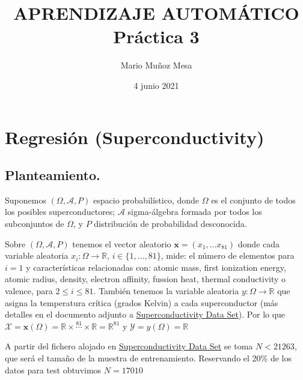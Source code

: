 \documentclass[11pt,a4paper]{article}
\title{
\normalfont \normalsize 
\textsc{\small APRENDIZAJE AUTOMÁTICO} \\ [10pt]
	
	
\huge \bf Práctica 3\\


	}
\author{Mario Muñoz Mesa}
\date{4 junio 2021}
\theoremstyle{definition}
\newcommand{\R}{\mathbb{R}}
\begin{document}
	\maketitle
	\renewcommand*\contentsname{Índice}	
	\tableofcontents
	
	\newpage
	
	\section{Regresión (Superconductivity)}
	\subsection{Planteamiento.}
	Suponemos $(\Omega, \mathcal{A}, P)$ espacio probabilístico, donde $\Omega$ es el conjunto de todos los posibles superconductores; $\mathcal{A}$ sigma-álgebra formada por todos los subconjuntos de $\Omega$, y $P$ distribución de probabilidad desconocida.
	
	Sobre $(\Omega, \mathcal{A}, P)$ tenemos el vector aleatorio $\mathbf{x}=(x_1,\ldots x_{81})$ donde cada variable aleatoria $x_i\colon \Omega \to \R$, $i\in \{1,\ldots,81\}$, mide: el número de elementos para $i=1$ y características relacionadas con: atomic mass, first ionization energy, atomic radius, density, electron affinity, fussion heat, thermal conductivity o valence, para $2\leq i \leq 81$. También tenemos la variable aleatoria $y\colon \Omega \to \R$ que asigna la temperatura crítica (grados Kelvin) a cada superconductor (más detalles en el documento adjunto a \href{https://archive.ics.uci.edu/ml/datasets/Superconductivty+Data}{
Superconductivity Data Set}). Por lo que $\mathcal{X}=\mathbf{x}(\Omega)=\R \times \stackrel{81}{\cdots} \times \R = \R^{81}$ y $\mathcal{Y}=y(\Omega)=\R$
	
	A partir del fichero alojado en \href{https://archive.ics.uci.edu/ml/datasets/Superconductivty+Data}{
Superconductivity Data Set} se toma $N < 21263$, que será el tamaño de la muestra de entrenamiento. Reservando el 20\% de los datos para test obtuvimos $N=17010 \iffalse- k\fi$%
\end{document}
